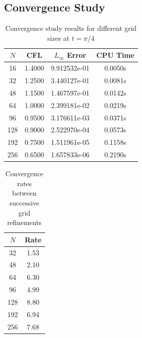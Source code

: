 \subsection{Convergence Study}
\begin{table}[H]
	\centering
	\begin{tabular}{|c|c|c|c|}
		\hline
		$N$ & CFL    & $L_\infty$ Error & CPU Time \\
		\hline
		16  & 1.4000 & 9.912532e-01     & 0.0050s  \\
		32  & 1.2500 & 3.440127e-01     & 0.0081s  \\
		48  & 1.1500 & 1.467597e-01     & 0.0142s  \\
		64  & 1.0000 & 2.399181e-02     & 0.0219s  \\
		96  & 0.9500 & 3.176611e-03     & 0.0371s  \\
		128 & 0.9000 & 2.522970e-04     & 0.0573s  \\
		192 & 0.7500 & 1.511961e-05     & 0.1158s  \\
		256 & 0.6500 & 1.657833e-06     & 0.2190s  \\
		\hline
	\end{tabular}
	\caption{Convergence study results for different grid sizes at $t = \pi/4$}
	\label{tab:convergence}
\end{table}

\begin{table}[H]
	\centering
	\begin{tabular}{|c|c|}
		\hline
		$N$ & Rate \\
		\hline
		32  & 1.53 \\
		48  & 2.10 \\
		64  & 6.30 \\
		96  & 4.99 \\
		128 & 8.80 \\
		192 & 6.94 \\
		256 & 7.68 \\
		\hline
	\end{tabular}
	\caption{Convergence rates between successive grid refinements}
	\label{tab:rates}
\end{table}

